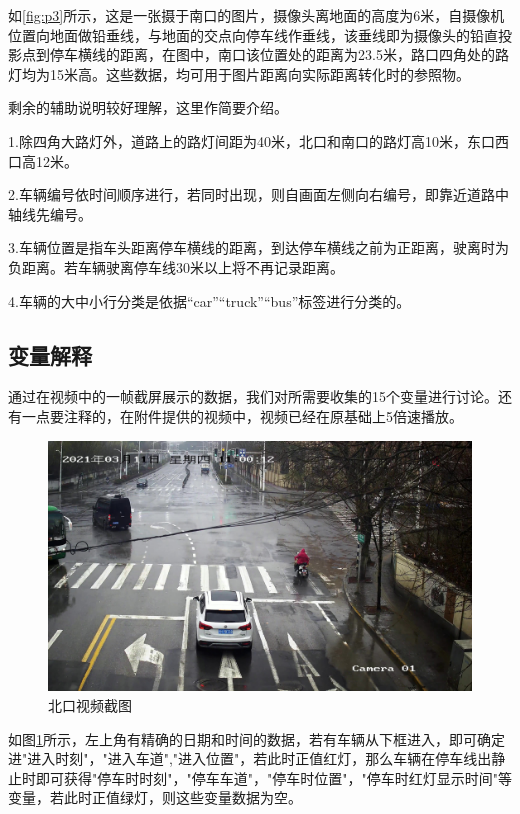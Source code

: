 如\ref{fig:p3}所示，这是一张摄于南口的图片，摄像头离地面的高度为6米，自摄像机位置向地面做铅垂线，与地面的交点向停车线作垂线，该垂线即为摄像头的铅直投影点到停车横线的距离，在图中，南口该位置处的距离为23.5米，路口四角处的路灯均为15米高。这些数据，均可用于图片距离向实际距离转化时的参照物。

剩余的辅助说明较好理解，这里作简要介绍。

1.除四角大路灯外，道路上的路灯间距为40米，北口和南口的路灯高10米，东口西口高12米。

2.车辆编号依时间顺序进行，若同时出现，则自画面左侧向右编号，即靠近道路中轴线先编号。

3.车辆位置是指车头距离停车横线的距离，到达停车横线之前为正距离，驶离时为负距离。若车辆驶离停车线30米以上将不再记录距离。

4.车辆的大中小行分类是依据“car”“truck”“bus”标签进行分类的。

\subsection{变量解释}\label{subsec:hypothesis-variables}

通过在视频中的一帧截屏展示的数据，我们对所需要收集的15个变量进行讨论。还有一点要注释的，在附件提供的视频中，视频已经在原基础上5倍速播放。

\begin{figure}[h]
    \centering
    \includegraphics[scale=0.1]{figures/视频截图.jpg}
    \caption{北口视频截图}
    \label{fig:p4}
\end{figure}

如图\ref{fig:p4}所示，左上角有精确的日期和时间的数据，若有车辆从下框进入，即可确定进"进入时刻"，"进入车道","进入位置"，若此时正值红灯，那么车辆在停车线出静止时即可获得"停车时时刻"，"停车车道"，"停车时位置"，"停车时红灯显示时间"等变量，若此时正值绿灯，则这些变量数据为空。

